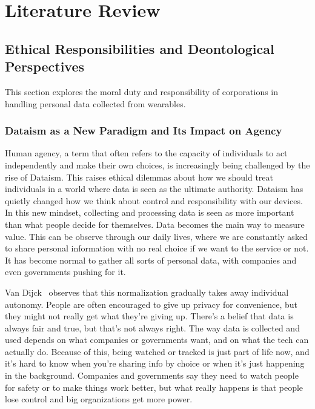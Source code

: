 \section{Literature Review}
\subsection{Ethical Responsibilities and Deontological Perspectives}
This section explores the moral duty and responsibility of corporations in handling personal data collected from wearables.
	\subsubsection{Dataism as a New Paradigm and Its Impact on Agency}

	Human agency, a term that often refers to the capacity of individuals to act independently and make their own choices, is increasingly being challenged by the rise of Dataism. This raises ethical dilemmas about how we should treat individuals in a world where data is seen as the ultimate authority.
	Dataism has quietly changed how we think about control and responsibility with our devices. 
	In this new mindset, collecting and processing data is seen as more important than what people decide for themselves. Data becomes the main way to measure value. This can be observe through our daily lives, where we are constantly asked to share personal information with no real choice if we want to the service or not. It has become normal to gather all sorts of personal data, with companies and even governments pushing for it.

	Van Dijck~\cite{VanDijck2014} observes that this normalization gradually takes away individual autonomy. 
	People are often encouraged to give up privacy for convenience, but they might not really get what they’re giving up. There’s a belief that data is always fair and true, but that’s not always right. The way data is collected and used depends on what companies or governments want, and on what the tech can actually do. Because of this, being watched or tracked is just part of life now, and it’s hard to know when you’re sharing info by choice or when it’s just happening in the background. Companies and governments say they need to watch people for safety or to make things work better, but what really happens is that people lose control and big organizations get more power.

